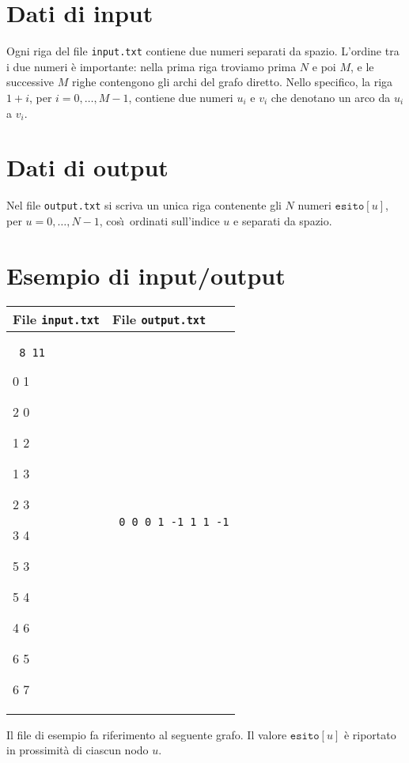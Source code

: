 \documentclass[a4paper,11pt]{article}
\newcommand{\file}[1]{\texttt{#1}}
\newcommand{\esempio}[2]{
  \noindent\begin{minipage}{\textwidth}
    \begin{tabular}{|p{11cm}|p{5cm}|}
      \hline
      \textbf{File \file{input.txt}} & \textbf{File \file{output.txt}}\\
      \hline
      \tt \small #1 &
      \tt \small #2 \\
      \hline
    \end{tabular}
  \end{minipage}
}
\begin{document}
\section*{Dati di input}
Ogni riga del file \verb'input.txt' contiene due numeri separati da spazio.  
L'ordine tra i due numeri \`e importante:
nella prima riga troviamo prima $N$ e poi $M$, e le successive $M$ righe contengono gli archi del grafo diretto.
Nello specifico, la riga $1+i$, per $i=0,\dots,M-1$, contiene due numeri $u_i$ e $v_i$ che denotano un arco da $u_i$ a $v_i$.

\section*{Dati di output}
Nel file \verb'output.txt' si scriva un unica riga contenente gli $N$ numeri $\texttt{esito}[u]$, per $u = 0,\dots,N-1$, cos\`\i\ ordinati sull'indice $u$ e separati da spazio.

\section*{Esempio di input/output}

\esempio{
8 11

0 1

2 0

1 2

1 3

2 3

3 4

5 3

5 4

4 6

6 5

6 7
}{
0 0 0 1 -1 1 1 -1

}

Il file di esempio fa riferimento al seguente grafo.
Il valore $\texttt{esito}[u]$ è riportato in prossimità di ciascun nodo $u$.

\begin{center}
\end{center}
\end{document}
